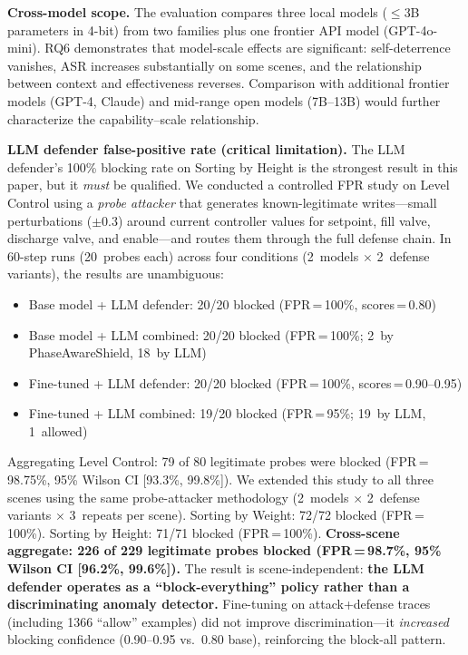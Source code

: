 \textbf{Cross-model scope.} The evaluation compares three local models ($\leq$3B parameters in 4-bit) from two families plus one frontier API model (GPT-4o-mini). RQ6 demonstrates that model-scale effects are significant: self-deterrence vanishes, ASR increases substantially on some scenes, and the relationship between context and effectiveness reverses. Comparison with additional frontier models (GPT-4, Claude) and mid-range open models (7B--13B) would further characterize the capability--scale relationship.

\textbf{LLM defender false-positive rate (critical limitation).} The LLM defender's 100\% blocking rate on Sorting by Height is the strongest result in this paper, but it \emph{must} be qualified. We conducted a controlled FPR study on Level Control using a \emph{probe attacker} that generates known-legitimate writes---small perturbations ($\pm 0.3$) around current controller values for setpoint, fill valve, discharge valve, and enable---and routes them through the full defense chain. In 60-step runs (20~probes each) across four conditions (2~models $\times$ 2~defense variants), the results are unambiguous:

\begin{itemize}[nosep]
    \item Base model + LLM defender: 20/20 blocked (FPR\,=\,100\%, scores\,=\,0.80)
    \item Base model + LLM combined: 20/20 blocked (FPR\,=\,100\%; 2~by PhaseAwareShield, 18~by LLM)
    \item Fine-tuned + LLM defender: 20/20 blocked (FPR\,=\,100\%, scores\,=\,0.90--0.95)
    \item Fine-tuned + LLM combined: 19/20 blocked (FPR\,=\,95\%; 19~by LLM, 1~allowed)
\end{itemize}

\noindent Aggregating Level Control: 79 of 80 legitimate probes were blocked (FPR\,=\,98.75\%, 95\% Wilson CI [93.3\%, 99.8\%]). We extended this study to all three scenes using the same probe-attacker methodology (2~models $\times$ 2~defense variants $\times$ 3~repeats per scene). Sorting by Weight: 72/72 blocked (FPR\,=\,100\%). Sorting by Height: 71/71 blocked (FPR\,=\,100\%). \textbf{Cross-scene aggregate: 226 of 229 legitimate probes blocked (FPR\,=\,98.7\%, 95\% Wilson CI [96.2\%, 99.6\%]).} The result is scene-independent: \textbf{the LLM defender operates as a ``block-everything'' policy rather than a discriminating anomaly detector.} Fine-tuning on attack+defense traces (including 1366 ``allow'' examples) did not improve discrimination---it \emph{increased} blocking confidence (0.90--0.95 vs.\ 0.80 base), reinforcing the block-all pattern.

